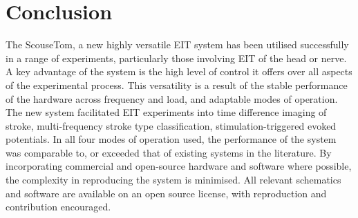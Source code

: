 \section{Conclusion}
The ScouseTom, a new highly versatile EIT system has been utilised successfully in a range of experiments, particularly those involving EIT of the head or nerve. A key advantage of the system is the high level of control it offers over all aspects of the experimental process. This versatility is a result of the stable performance of the hardware across frequency and load, and adaptable modes of operation. The new system facilitated EIT experiments into time difference imaging of stroke, multi-frequency stroke type classification, stimulation-triggered evoked potentials. In all four modes of operation used, the performance of the system was comparable to, or exceeded that of existing systems in the literature. By incorporating commercial and open-source hardware and software where possible, the complexity in reproducing the system is minimised. All relevant schematics and software are available on an open source license, with reproduction and contribution encouraged. 